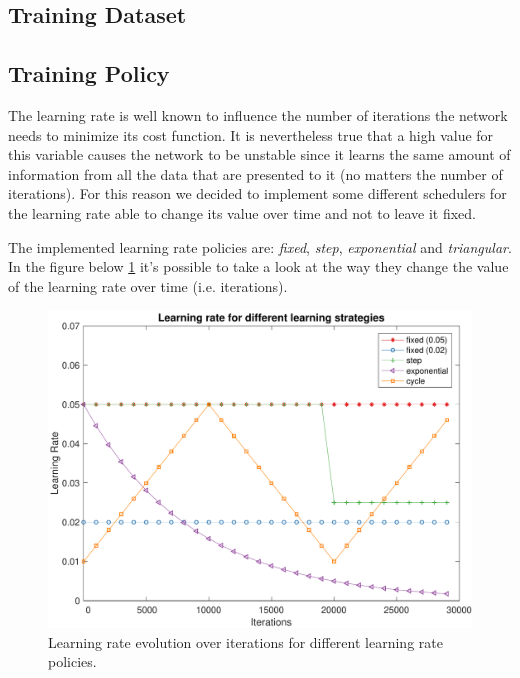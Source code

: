 \subsection{Training Dataset}

\subsection{Training Policy}
The learning rate is well known to influence the number of iterations the network needs to minimize
its cost function. It is nevertheless true that a high value for this variable causes the network to
be unstable since it learns the same amount of information from all the data that are presented to it (no matters the number of iterations).
For this reason we decided to implement some different schedulers for the learning rate able to change its
value over time and not to leave it fixed.

The implemented learning rate policies are: \textit{fixed}, \textit{step}, \textit{exponential} and \textit{triangular}.
In the figure below \cref{fig:learning_rates_policies} it's possible to take a look at the way they change the value of the learning rate over time (i.e. iterations).


\begin{figure}
	\centering
	\includegraphics[width=\columnwidth]{figures/learning_rates}
	\caption{Learning rate evolution over iterations for different learning rate policies.}
	\label{fig:learning_rates_policies}
\end{figure}

